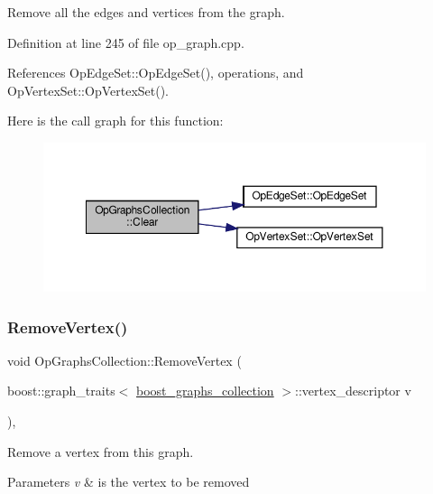 Remove all the edges and vertices from the graph. 



Definition at line 245 of file op\+\_\+graph.\+cpp.



References Op\+Edge\+Set\+::\+Op\+Edge\+Set(), operations, and Op\+Vertex\+Set\+::\+Op\+Vertex\+Set().

Here is the call graph for this function\+:
\nopagebreak
\begin{figure}[H]
\begin{center}
\leavevmode
\includegraphics[width=350pt]{da/df9/classOpGraphsCollection_a625992dd75b06e471812a41fbcd4502c_cgraph}
\end{center}
\end{figure}
\mbox{\label{classOpGraphsCollection_afb2e5e89d55bac25193625245b7de2fd}} 
\subsubsection{\texorpdfstring{Remove\+Vertex()}{RemoveVertex()}}
{\footnotesize\ttfamily void Op\+Graphs\+Collection\+::\+Remove\+Vertex (\begin{DoxyParamCaption}\item[{boost\+::graph\+\_\+traits$<$ \hyperlink{graph_8hpp_a315f0e4c95fedf30b91945ed29d42332}{boost\+\_\+graphs\+\_\+collection} $>$\+::vertex\+\_\+descriptor}]{v }\end{DoxyParamCaption})\hspace{0.3cm}{\ttfamily [override]}, {\ttfamily [virtual]}}



Remove a vertex from this graph. 


\begin{DoxyParams}{Parameters}
{\em v} & is the vertex to be removed \\
\hline
\end{DoxyParams}


